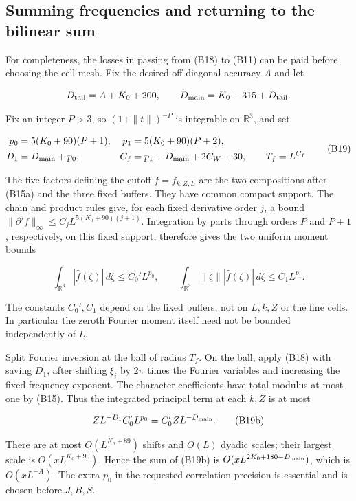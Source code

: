 \hypertarget{bilinear-summing-frequencies-and-returning-to-the-bilinear-sum}{%
\subsection{Summing frequencies and returning to the bilinear
sum}\label{bilinear-summing-frequencies-and-returning-to-the-bilinear-sum}}

For completeness, the losses in passing from (B18) to (B11) can be paid
before choosing the cell mesh. Fix the desired off-diagonal accuracy
\(A\) and let

\[
D_{\rm tail}=A+K_0+200,\qquad
D_{\rm main}=K_0+315+D_{\rm tail}.
\]

Fix an integer \(P>3\), so \((1+\|t\|)^{-P}\) is integrable on
\(\mathbb R^3\), and set

\[
\begin{aligned}
p_0&=5(K_0+90)(P+1),&p_1&=5(K_0+90)(P+2),\\
D_1&=D_{\rm main}+p_0,&
C_f&=p_1+D_{\rm main}+2C_W+30,\qquad T_f=L^{C_f}.
\end{aligned}\tag{B19}
\]

The five factors defining the cutoff \(f=f_{k,Z,L}\) are the two
compositions after (B15a) and the three fixed buffers. They have common
compact support. The chain and product rules give, for each fixed
derivative order \(j\), a bound
\(\|\partial^j f\|_\infty\le C_jL^{5(K_0+90)(j+1)}\). Integration by
parts through orders \(P\) and \(P+1\), respectively, on this fixed
support, therefore gives the two uniform moment bounds

\[
\int_{\mathbb R^3}|\widehat f(\zeta)|\,d\zeta
 \le C_0'L^{p_0},\qquad
\int_{\mathbb R^3}\|\zeta\||\widehat f(\zeta)|\,d\zeta
 \le C_1L^{p_1}.
\tag{B19a}
\]

The constants \(C_0',C_1\) depend on the fixed buffers, not on \(L,k,Z\)
or the fine cells. In particular the zeroth Fourier moment itself need
not be bounded independently of \(L\).

Split Fourier inversion at the ball of radius \(T_f\). On the ball,
apply (B18) with saving \(D_1\), after shifting \(\xi_i\) by \(2\pi\)
times the Fourier variables and increasing the fixed frequency exponent.
The character coefficients have total modulus at most one by (B15). Thus
the integrated principal term at each \(k,Z\) is at most

\[
ZL^{-D_1}C_0'L^{p_0}=C_0'ZL^{-D_{\rm main}}.
\tag{B19b}
\]

There are at most \(O(L^{K_0+89})\) shifts and \(O(L)\) dyadic scales;
their largest scale is \(O(xL^{K_0+90})\). Hence the sum of (B19b) is
\(O(xL^{2K_0+180-D_{\rm main}})\), which is \(O(xL^{-A})\). The extra
\(p_0\) in the requested correlation precision is essential and is
chosen before \(J,B,S\).

